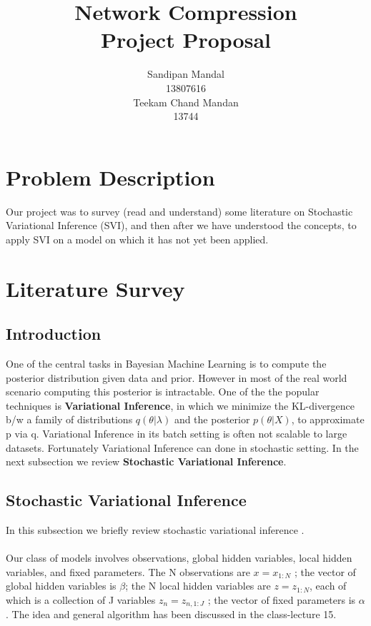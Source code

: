\documentclass{article} %
\title{Network Compression \\
\large{Project Proposal}}
\author{
Sandipan Mandal \\
13807616 \\
\And
Teekam Chand Mandan \\
13744 
}
\begin{document}
\maketitle

\section{Problem Description}
    Our project was to survey (read and understand) some literature on Stochastic Variational Inference (SVI), and then after we have understood the concepts, to apply SVI on a model on which it has not yet been applied. 

\section{Literature Survey}

    \subsection{Introduction}

        One of the central tasks in Bayesian Machine Learning is to compute the posterior distribution given data and prior. However in most of the real world scenario computing this posterior is intractable. One of the the popular techniques is \textbf{Variational Inference}, in which we minimize the KL-divergence b/w a family of distributions $q(\theta|\lambda)$ and the posterior $p(\theta|X)$, to approximate p via q. Variational Inference in its batch setting is often not scalable to large datasets. Fortunately Variational Inference can done in stochastic setting. In the next subsection we review \textbf{Stochastic Variational Inference}. 
    
    \subsection{Stochastic Variational Inference}

        In this subsection we briefly review stochastic variational inference \cite{svi}.\\\\
        Our class of models involves observations, global hidden variables, local hidden variables, and fixed
        parameters. The N observations are $x = x_{1:N}$ ; the vector of global hidden variables is $\beta$; the N local hidden variables are $z = z_{1:N}$, each of which is a collection of J variables $z_n = z_{n,1:J}$ ; the vector of fixed parameters is $\alpha$. The idea and general algorithm has been discussed in the class-lecture 15.\\
        
\end{document}
